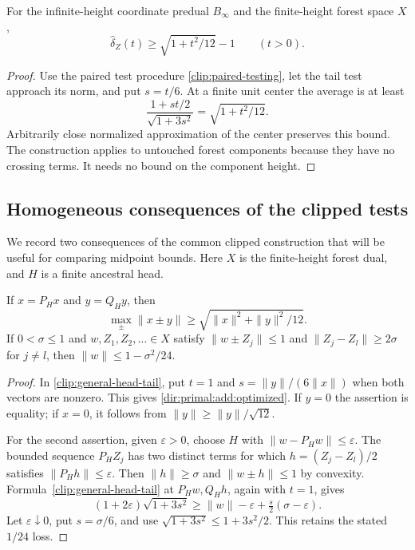\begin{corollary}\label{clip:paired-modulus}
For the infinite-height coordinate predual $B_\infty$ and the
finite-height forest space $X$,
\[
 \widehat\delta_Z(t)\ge\sqrt{1+t^2/12}-1\qquad(t>0).
\]
\end{corollary}
\begin{proof}
Use the paired test procedure \eqref{clip:paired-testing}, let the
tail test approach its norm, and put $s=t/6$. At a finite unit center
the average is at least
\[
 \frac{1+st/2}{\sqrt{1+3s^2}}=\sqrt{1+t^2/12}.
\]
Arbitrarily close normalized approximation of the center preserves this
bound. The construction applies to untouched forest components because
they have no crossing terms. It needs no bound on the component height.
\end{proof}

\subsection{Homogeneous consequences of the clipped tests}
\label{dir:primal:add:homogeneous}
We record two consequences of the common clipped construction that
will be useful for comparing midpoint bounds. Here \(X\) is the finite-height
forest dual, and \(H\) is a finite ancestral head.

\begin{proposition}\label{dir:primal:add:head-tail-lens}
If \(x=P_Hx\) and \(y=Q_Hy\), then
\begin{equation}\label{dir:primal:add:optimized}
 \max_{\pm}\|x\pm y\|\ge\sqrt{\|x\|^2+\|y\|^2/12}.
\end{equation}
If \(0<\sigma\le1\) and \(w,Z_1,Z_2,\ldots\in X\) satisfy
\(\|w\pm Z_j\|\le1\) and \(\|Z_j-Z_l\|\ge2\sigma\) for \(j\ne l\),
then \(\|w\|\le1-\sigma^2/24\).
\end{proposition}
\begin{proof}
In \eqref{clip:general-head-tail}, put \(t=1\) and
\(s=\|y\|/(6\|x\|)\) when both vectors are nonzero. This gives
\eqref{dir:primal:add:optimized}. If \(y=0\) the assertion is equality;
if \(x=0\), it follows from \(\|y\|\ge\|y\|/\sqrt{12}\).

For the second assertion, given \(\varepsilon>0\), choose \(H\) with
\(\|w-P_Hw\|\le\varepsilon\). The bounded sequence \(P_HZ_j\) has two
distinct terms for which \(h=(Z_j-Z_l)/2\) satisfies
\(\|P_Hh\|\le\varepsilon\). Then \(\|h\|\ge\sigma\) and
\(\|w\pm h\|\le1\) by convexity. Formula~\eqref{clip:general-head-tail}
at \(P_Hw,Q_Hh\), again with \(t=1\), gives
\[
 (1+2\varepsilon)\sqrt{1+3s^2}
 \ge\|w\|-\varepsilon+\tfrac{s}{2}(\sigma-\varepsilon).
\]
Let \(\varepsilon\downarrow0\), put \(s=\sigma/6\), and use
\(\sqrt{1+3s^2}\le1+3s^2/2\). This retains the stated \(1/24\) loss.
\end{proof}

